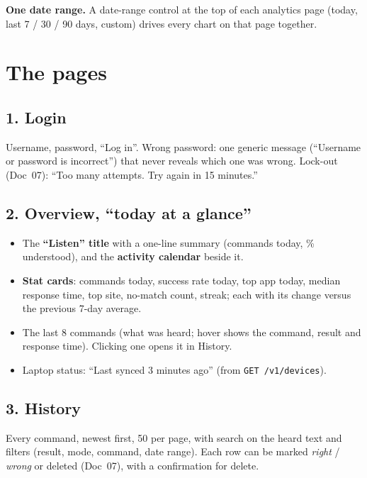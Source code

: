 \documentclass[11pt,a4paper]{article}
\begin{document}
\noindent \textbf{One date range.} A date-range control at the top of each analytics page (today,
last 7 / 30 / 90 days, custom) drives every chart on that page together.

\section{The pages}

\subsection{1. Login}
Username, password, ``Log in''. Wrong password: one generic message (``Username or password is
incorrect'') that never reveals which one was wrong. Lock-out (Doc~07): ``Too many attempts. Try
again in 15 minutes.''

\subsection{2. Overview, ``today at a glance''}
\begin{itemize}[nosep]
  \item The \textbf{``Listen'' title} with a one-line summary (commands today, \% understood), and
        the \textbf{activity calendar} beside it.
  \item \textbf{Stat cards}: commands today, success rate today, top app today, median response
        time, top site, no-match count, streak; each with its change versus the previous 7-day
        average.
  \item The last 8 commands (what was heard; hover shows the command, result and response time).
        Clicking one opens it in History.
  \item Laptop status: ``Last synced 3 minutes ago'' (from \texttt{GET /v1/devices}).
\end{itemize}

\subsection{3. History}
Every command, newest first, 50 per page, with search on the heard text and filters (result,
mode, command, date range). Each row can be marked \emph{right} / \emph{wrong} or deleted
(Doc~07), with a confirmation for delete.
\end{document}
